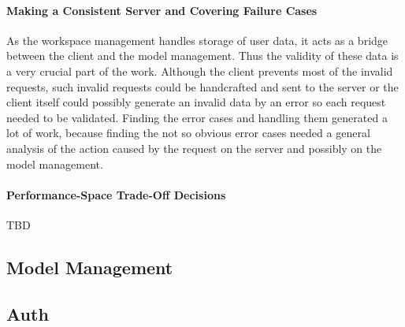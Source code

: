 \paragraph{Making a Consistent Server and Covering Failure Cases}
As the workspace management handles storage of user data, it acts as a bridge between the client and the model management. Thus the validity of these data is a very crucial part of the work. Although the client prevents most of the invalid requests, such invalid requests could be handcrafted and sent to the server or the client itself could possibly generate an invalid data by an error so each request needed to be validated. Finding the error cases and handling them generated a lot of work, because finding the not so obvious error cases needed a general analysis of the action caused by the request on the server and possibly on the model management.
\paragraph{Performance-Space Trade-Off Decisions}
TBD
\subsection{Model Management}
\subsection{Auth}
